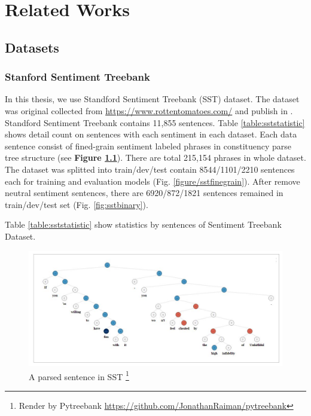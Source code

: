 \chapter{Related Works}\label{chap:related-work}

\section{Datasets}\label{sec:dataset}
\subsection{Stanford Sentiment Treebank} \label{sec:sst}
In this thesis, we use Standford Sentiment Treebank (SST) dataset\cite{socher2013recursive}. The dataset was original collected from \url{https://www.rottentomatoes.com/} and publish in \cite{pang2002thumbs}. Standford Sentiment Treebank contains 11,855 sentences. Table \ref{table:sststatistic} shows detail count on sentences with each sentiment in each dataset. Each data sentence consist of fined-grain sentiment labeled phrases in constituency parse tree structure (see \textbf{Figure \ref{fig:sst}}). There are total 215,154 phrases in whole dataset. 
The dataset was splitted into train/dev/test contain 8544/1101/2210 sentences each for training and evaluation models (Fig. \ref{figure/sstfinegrain}). After remove neutral sentiment sentences, there are 6920/872/1821 sentences remained in train/dev/test set (Fig. \ref{fig:sstbinary}).


Table \ref{table:sststatistic} show statistics by sentences of Sentiment Treebank Dataset.


\begin{figure}[H]
	\begin{minipage}{\textwidth}
		\centering
		\includegraphics[width=0.9\linewidth]{figure/sst}
		\caption[A parsed sentence in SST]{A parsed sentence in SST \footnote{Render by Pytreebank \url{https://github.com/JonathanRaiman/pytreebank}}}
		\label{fig:sst}
	\end{minipage}
\end{figure}


